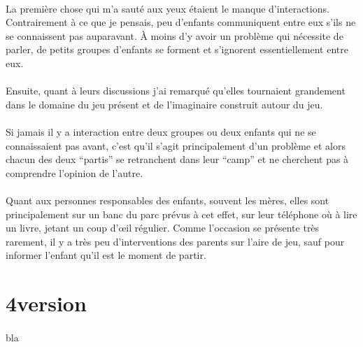 \paragraph{} La première chose qui m'a sauté aux yeux étaient le manque
d'interactions. Contrairement à ce que je pensais, peu d'enfants communiquent
entre eux s'ils ne se connaissent pas auparavant. À moins d'y avoir un problème
qui nécessite de parler, de petits groupes d'enfants se forment et s'ignorent
essentiellement entre eux.

\paragraph{} Ensuite, quant à leurs discussions j'ai remarqué qu'elles
tournaient grandement dans le domaine du jeu présent et de l'imaginaire
construit autour du jeu.

\paragraph{} Si jamais il y a interaction entre deux groupes ou deux enfants
qui ne se connaissaient pas avant, c'est qu'il s'agit principalement d'un
problème et alors chacun des deux ``partis'' se retranchent dans leur ``camp''
et ne cherchent pas à comprendre l'opinion de l'autre.

\paragraph{} Quant aux personnes responsables des enfants, souvent les
mères, elles sont principalement sur un banc du parc prévus à cet effet, sur
leur téléphone où à lire un livre, jetant un coup d'œil régulier. Comme
l'occasion se présente très rarement, il y a très peu d'interventions des
parents sur l'aire de jeu, sauf pour informer l'enfant qu'il est le moment de
partir.

\section{4\ieme version}

\paragraph{}
bla
